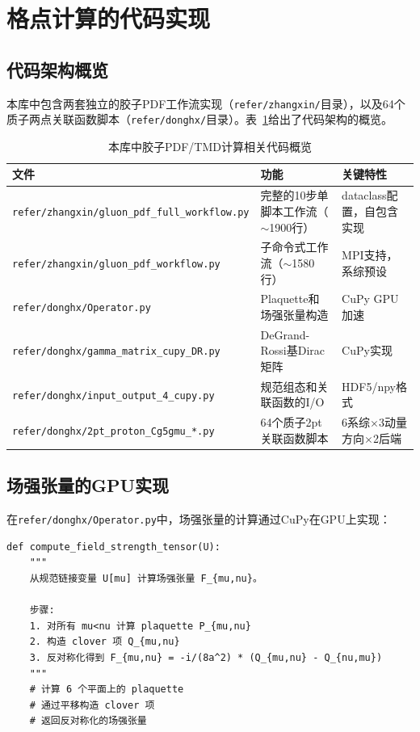 \documentclass[12pt,a4paper]{ctexart}
\theoremstyle{definition}
\begin{document}

\section{格点计算的代码实现}

\subsection{代码架构概览}

本库中包含两套独立的胶子PDF工作流实现（\texttt{refer/zhangxin/}目录），以及64个质子两点关联函数脚本（\texttt{refer/donghx/}目录）。表~\ref{tab:code_structure}给出了代码架构的概览。

\begin{table}[H]
\centering
\caption{本库中胶子PDF/TMD计算相关代码概览}
\label{tab:code_structure}
\begin{tabular}{lp{7cm}p{4cm}}
\toprule
文件 & 功能 & 关键特性 \\
\midrule
\texttt{refer/zhangxin/gluon\_pdf\_full\_workflow.py} & 完整的10步单脚本工作流（$\sim$1900行） & dataclass配置，自包含实现 \\
\texttt{refer/zhangxin/gluon\_pdf\_workflow.py} & 子命令式工作流（$\sim$1580行） & MPI支持，系综预设 \\
\texttt{refer/donghx/Operator.py} & Plaquette和场强张量构造 & CuPy GPU加速 \\
\texttt{refer/donghx/gamma\_matrix\_cupy\_DR.py} & DeGrand-Rossi基Dirac矩阵 & CuPy实现 \\
\texttt{refer/donghx/input\_output\_4\_cupy.py} & 规范组态和关联函数的I/O & HDF5/npy格式 \\
\texttt{refer/donghx/2pt\_proton\_Cg5gmu\_*.py} & 64个质子2pt关联函数脚本 & 6系综$\times$3动量方向$\times$2后端 \\
\bottomrule
\end{tabular}
\end{table}

\subsection{场强张量的GPU实现}

在\texttt{refer/donghx/Operator.py}中，场强张量的计算通过CuPy在GPU上实现：

\begin{verbatim}
def compute_field_strength_tensor(U):
    """
    从规范链接变量 U[mu] 计算场强张量 F_{mu,nu}。

    步骤:
    1. 对所有 mu<nu 计算 plaquette P_{mu,nu}
    2. 构造 clover 项 Q_{mu,nu}
    3. 反对称化得到 F_{mu,nu} = -i/(8a^2) * (Q_{mu,nu} - Q_{nu,mu})
    """
    # 计算 6 个平面上的 plaquette
    # 通过平移构造 clover 项
    # 返回反对称化的场强张量
\end{verbatim}
\end{document}
